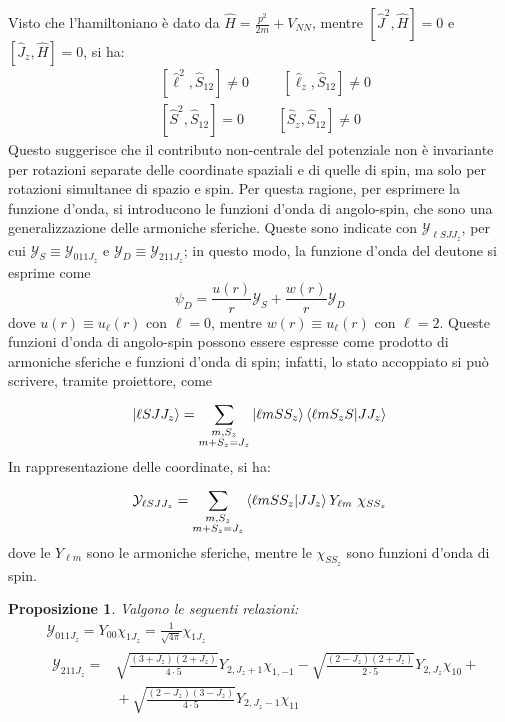 \documentclass[11pt, a4paper]{scrartcl}
\theoremstyle{style}
\newtheorem{prop}{Proposizione}[section]
\numberwithin{equation}{subsection}
\begin{document}
Visto che l'hamiltoniano \`e dato da $\hat{H} = \frac{p^2}{2m} + V_{N N}$, mentre $[\hat{J}^2 , \hat{H}] = 0$ e $[\hat{J}_z , \hat{H}] = 0$, si ha:
\[
	\begin{split}
		&[\hat{\ell }^2 , \hat{S}_{12}] \neq 0 \hspace{1cm} [\hat{\ell }_z , \hat{S}_{12}] \neq 0 \\
		&[\hat{S}^2 , \hat{S}_{12}] = 0 \hspace{1cm} [\hat{S}_z , \hat{S}_{12}] \neq 0
	\end{split}
\] 
Questo suggerisce che il contributo non-centrale del potenziale non \`e invariante per rotazioni separate delle coordinate spaziali e di quelle di spin, ma solo per rotazioni simultanee di spazio e spin.
Per questa ragione, per esprimere la funzione d'onda, si introducono le funzioni d'onda di angolo-spin, che sono una generalizzazione delle armoniche sferiche.
Queste sono indicate con $\mathcal{Y} _{\ell S JJ_z}$, per cui $\mathcal{Y}  _S \equiv \mathcal{Y} _{011J_z}$ e $\mathcal{Y} _D \equiv \mathcal{Y} _{211J_z}$; in questo modo, la funzione d'onda del deutone si esprime come
\begin{equation}
	\psi _D = \frac{u(r)}{ r} \mathcal{Y} _S + \frac{w(r)}{r} \mathcal{Y} _D
\end{equation}
dove $u(r) \equiv u_\ell (r)$ con $\ell =0$, mentre $w(r) \equiv u_\ell (r)$ con $\ell =2$.
Queste funzioni d'onda di angolo-spin possono essere espresse come prodotto di armoniche sferiche e funzioni d'onda di spin; infatti, lo stato accoppiato si pu\`o scrivere, tramite proiettore, come
\[
	\ket{\ell S J J_z}  = \sum_{\substack{m,S_z\\ m + S_z = J_z}}^{} \ket{\ell mS S_z} \braket{\ell mS_z S|J J_z} 
\] 
In rappresentazione delle coordinate, si ha:
\begin{equation}
	\mathcal{Y} _{\ell S J J_z} = \sum_{\substack{m, S_z \\ m+S_z = J_z}}^{} \braket{\ell mSS_z|J J_z}  Y_{\ell m}\ \chi _{SS_z}
\end{equation}
dove le $Y_{\ell m}$ sono le armoniche sferiche, mentre le $\chi _{S S_z}$ sono funzioni d'onda di spin.
\begin{prop}
Valgono le seguenti relazioni:
\[
\begin{split}
	&\mathcal{Y} _{011J_z} = Y_{00} \chi _{1J_z}= \frac{1}{\sqrt{4\pi}}  \chi _{1J_z}\\
	&\begin{split}
		\mathcal{Y} _{211J_z} =& \sqrt{\frac{(3+J_z)(2+J_z)}{4\cdot 5}}  Y_{2,J_{z}+1} \chi _{1,-1} - \sqrt{\frac{(2-J_z)(2+J_z)}{2\cdot 5}} Y_{2,J_z}\chi_{10} + { } \\
				       &{ } + \sqrt{\frac{(2-J_z)(3-J_z)}{4\cdot 5}}  Y_{2,J_z-1}\chi _{11}
	\end{split}
\end{split}
\] 
\end{prop}
\end{document}
